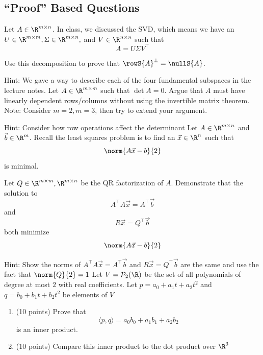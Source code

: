 \documentclass[12pt,addpoints]{exam}
\begin{document}
    \vfill
    \begin{center}
        \gradetable[h]
    \end{center}
    \newpage
    \begin{questions}
        \section*{``Proof'' Based Questions}
        \question[20] Let $A\in\R^{m\times n}$. In class, we discussed the SVD, which means we have an
        $U\in\R^{m\times m},\Sigma\in\R^{m\times n},$ and $V\in\R^{n\times n}$ such that
        \[
            A = U\Sigma V^\top
        \]

        Use this decomposition to prove that $\rowS{A}^\perp = \nullS{A}$.

        Hint: We gave a way to describe each of the four fundamental subspaces in the lecture notes.
        \vfill
        \newpage
        \question[20] Let $A\in\R^{m\times m}$ such that $\det{A} = 0$. Argue that $A$ must have
        linearly dependent rows/columns without using the invertible matrix theorem.
        Note: Consider $m=2,m=3$, then try to extend your argument.

        Hint: Consider how row operations affect the determinant
        \vfill
        \newpage
        \question[20] Let $A\in\R^{m\times n}$ and $\vec{b}\in\R^{m}$.
        Recall the least squares problem is to find an $\vec{x}\in\R^{n}$ such that
        \[
            \norm{A\vec{x} - b}{2}
        \]
        is minimal.

        Let $Q\in\R^{m\times m},\R^{m\times n}$ be the QR factorization of $A$. Demonstrate that
        the solution to
        \[
            A^\top A \vec{x} = A^\top\vec{b}
        \]
        and
        \[
            R \vec{x} = Q^\top\vec{b}
        \]
        both minimize
        \[
            \norm{A\vec{x} - b}{2}
        \]

        Hint: Show the norms of $ A^\top A \vec{x} = A^\top\vec{b} $ and $ R \vec{x} = Q^\top\vec{b} $
        are the same and use the fact that $\norm{Q}{2} = 1$
        \vfill
        \newpage
        \question[20] Let $V=\mathcal{P}_2(\R)$ be the set of all polynomials of degree at most $2$
        with real coefficients. Let $p = a_0 + a_1t + a_2t^2$ and $q = b_0 + b_1t + b_2t^2$ be elements
        of $V$

        \begin{enumerate}
            \item(10 points)
                Prove that
                \[
                    \langle p,q\rangle = a_0b_0 + a_1b_1 + a_2b_2
                \]
                is an inner product.
            \item(10 points)
                Compare this inner product to the dot product over $\R^3$
        \end{enumerate}
        \vfill
        \newpage

\end{questions}
\end{document}
